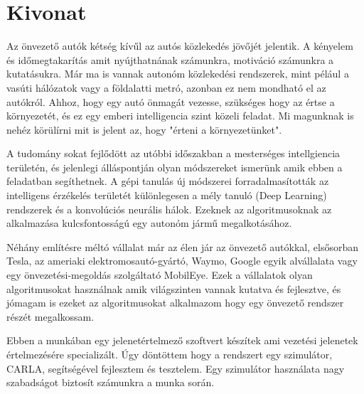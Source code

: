 \setcounter{page}{1}



\selecthungarian

\chapter*{Kivonat}

Az önvezető autók kétség kívűl az autós közlekedés jövőjét jelentik. A kényelem
és időmegtakarítás amit nyújthatnának számunkra, motiváció számunkra a
kutatásukra. Már ma is vannak autonóm közlekedési rendszerek, mint pélául a
vasúti hálózatok vagy a földalatti metró, azonban ez nem mondható el az
autókról. Ahhoz, hogy egy autó önmagát vezesse, szükséges hogy az értse a
környezetét, és ez egy emberi intelligencia szint közeli feladat. Mi magunknak is
nehéz körülírni mit is jelent az, hogy "érteni a környezetünket".

A tudomány sokat fejlődött az utóbbi időszakban a mesterséges intellgiencia
területén, és jelenlegi álláspontján olyan módszereket ismerünk amik ebben a
feladatban segíthetnek. A gépi tanulás új módszerei forradalmasították az
intelligens érzékelés területét különlegesen a mély tanuló (Deep Learning)
rendszerek és a konvolúciós neurális hálok. Ezeknek az algoritmusoknak az
alkalmazása kulcsfontosságú egy autonóm jármű megalkotásához.

Néhány említésre méltó vállalat már az élen jár az önvezető autókkal, elsősorban
Tesla, az ameriaki elektromosautó-gyártó, Waymo, Google egyik alvállalata vagy
egy önvezetési-megoldás szolgáltató MobilEye. Ezek a vállalatok olyan
algoritmusokat használnak amik világszinten vannak kutatva és fejlesztve, és
jómagam is ezeket az algoritmusokat alkalmazom hogy egy önvezető rendszer
részét megalkossam. 

Ebben a munkában egy jelenetértelmező szoftvert készítek ami vezetési jelenetek
értelmezésére specializált. Úgy döntöttem hogy a rendszert egy szimulátor,
CARLA, segítségével fejlesztem és tesztelem. Egy szimulátor használata nagy
szabadságot biztosít számunkra a munka során.


